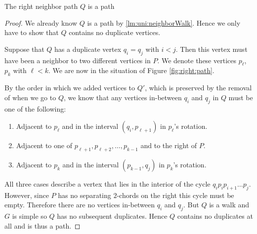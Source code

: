   \begin{lemma}
    \label{lm:uni:neighborPath}
    The right neighbor path $Q$ is a path
  \end{lemma}
  \begin{proof}
    We already know $Q$ is a path by \ref{lm:uni:neighborWalk}. Hence we only have to show that $Q$ contains no duplicate vertices.

    Suppose that $Q$ has a duplicate vertex $q_i=q_j$ with $i<j$. Then this vertex must have been a neighbor to two different vertices in $P$. We denote these vertices $p_\ell$, $p_k$ with $\ell<k$. We are now in the situation of Figure \ref{fig:right:path}.

    By the order in which we added vertices to $Q'$, which is preserved by the removal of when we go to $Q$, we know that any vertices in-between $q_i$ and $q_j$ in $Q$ must be one of the following:
    \begin{enumerate}
      \item Adjacent to $p_\ell$ and in the interval $(q_i, p_{\ell+1})$ in $p_\ell$'s rotation.
      \item Adjacent to one of $p_{\ell+1},  p_{\ell+2},\ldots, p_{k-1}$ and to the right of $P$.
      \item Adjacent to $p_k$ and in the interval $(p_{k-1}, q_j)$ in $p_k$'s rotation.
    \end{enumerate}


    All three cases describe a vertex that lies in the interior of the cycle $q_i p_i p_{i+1} \ldots p_j$. However, since $P$ has no separating $2$-chords on the right this cycle must be empty. Therefore there are no vertices in-between $q_i$ and $q_j$. But $Q$ is a walk and $G$ is simple  so $Q$ has no subsequent duplicates. Hence $Q$ contains no duplicates at all and is thus a path.
  \end{proof}

